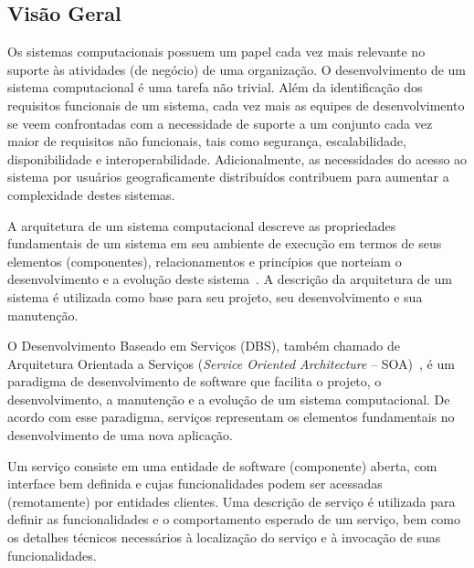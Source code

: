 \subsection{Visão Geral}\label{2-fundamentacao-dbs-visao-geral}

Os sistemas computacionais possuem um papel cada vez mais relevante no suporte às atividades (de negócio) de uma organização. O desenvolvimento de um sistema computacional é uma tarefa não trivial. Além da identificação dos requisitos funcionais de um sistema, cada vez mais as equipes de desenvolvimento se veem confrontadas com a necessidade de suporte a um conjunto cada vez maior de requisitos não funcionais, tais como segurança, escalabilidade, disponibilidade e interoperabilidade. Adicionalmente, as necessidades do acesso ao sistema por usuários geograficamente distribuídos contribuem para aumentar a complexidade destes sistemas.

A arquitetura de um sistema computacional descreve as propriedades fundamentais de um sistema em seu ambiente de execução em termos de seus elementos (componentes), relacionamentos e princípios que norteiam o desenvolvimento e a evolução deste sistema~\cite{IEEE-2011-ARQUITETURA}. A descrição da arquitetura de um sistema é utilizada como base para seu projeto, seu desenvolvimento e sua manutenção.

O Desenvolvimento Baseado em Serviços (DBS), também chamado de Arquitetura Orientada a Serviços (\textit{Service Oriented Architecture} – SOA)~\cite{PAPAZOGLOU-GEORGAKOPOULOS-2003-Service-Oriented-Computing, VALIPOUR-AMIRZAFARI-MALEKI-DANESHPOUR-2009-SOA}, é um paradigma de desenvolvimento de software que facilita o projeto, o desenvolvimento, a manutenção e a evolução de um sistema computacional. De acordo com esse paradigma, serviços representam os elementos fundamentais no desenvolvimento de uma nova aplicação.


Um serviço consiste em uma entidade de software (componente) aberta, com interface bem definida e cujas funcionalidades podem ser acessadas (remotamente) por entidades clientes. Uma descrição de serviço é utilizada para definir as funcionalidades e o comportamento esperado de um serviço, bem como os detalhes técnicos necessários à localização do serviço e à invocação de suas funcionalidades.

